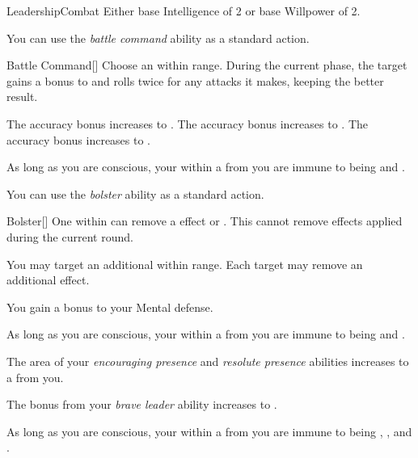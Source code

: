     \begin{feat}{Leadership}{Combat}
        \featpre Either base Intelligence of 2 or base Willpower of 2.

         You can use the \textit{battle command} ability as a standard action.
        \begin{freeability}{Battle Command}[]
            Choose an  within \rngmed range.
            During the current phase, the target gains a  bonus to  and rolls twice for any attacks it makes, keeping the better result.

            \rankline
             The accuracy bonus increases to .
             The accuracy bonus increases to .
             The accuracy bonus increases to .
        \end{freeability}

         As long as you are conscious, your  within a \arealarge {} from you are immune to being \shaken and \frightened.

         You can use the \textit{bolster} ability as a standard action.
        \begin{freeability}{Bolster}[]
            One  within \medrange can remove a  effect or .
            This cannot remove effects applied during the current round.

            \rankline
             You may target an additional  within range.
             Each target may remove an additional effect.
        \end{freeability}

         You gain a  bonus to your Mental defense.

         As long as you are conscious, your  within a \arealarge {} from you are immune to being \dazed and \stunned.

         The area of your \textit{encouraging presence} and \textit{resolute presence} abilities increases to a \hugearea {} from you.

         The bonus from your \textit{brave leader} ability increases to .

         As long as you are conscious, your  within a \areahuge {} from you are immune to being \confused, \panicked, and \paralyzed.
    \end{feat}

